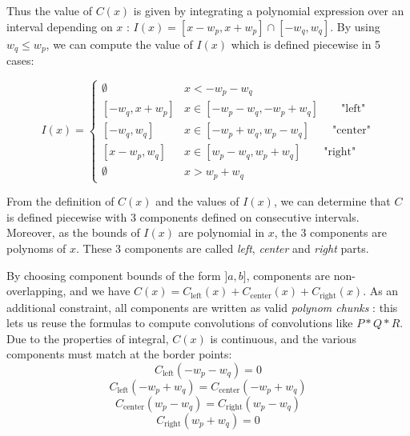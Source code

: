 \documentclass[a4paper,10pt]{article}
\newcommand\Convolution{\ast}
\begin{document}
Thus the value of $C(x)$ is given by integrating a polynomial expression over an interval depending on $x$ : $I(x) = [x-w_p,x+w_p] \cap [-w_q,w_q]$.
By using $w_q \le w_p$, we can compute the value of $I(x)$ which is defined piecewise in 5 cases:
\begin{center}\end{center}
\[ I(x) = \begin{cases}
    \emptyset & x < -w_p-w_q \\
    [-w_q, x+w_p] & x \in [-w_p-w_q, -w_p+w_q] \qquad \text{"left"} \\
    [-w_q, w_q] & x \in [-w_p+w_q, w_p-w_q] \qquad \text{"center"} \\
    [x-w_p, w_q] & x \in [w_p-w_q, w_p+w_q] \qquad \text{"right"} \\
    \emptyset & x > w_p + w_q
\end{cases} \]

From the definition of $C(x)$ and the values of $I(x)$, we can determine that $C$ is defined piecewise with 3 components defined on consecutive intervals.
Moreover, as the bounds of $I(x)$ are polynomial in $x$, the 3 components are polynoms of $x$.
These 3 components are called \emph{left}, \emph{center} and \emph{right} parts.

By choosing component bounds of the form $]a,b]$, components are non-overlapping, and we have $C(x) = C_\text{left}(x) + C_\text{center}(x) + C_\text{right}(x)$.
As an additional constraint, all components are written as valid \emph{polynom chunks} : this lets us reuse the formulas to compute convolutions of convolutions like $P \Convolution Q \Convolution R$.
Due to the properties of integral, $C(x)$ is continuous, and the various components must match at the border points:
\[ C_\text{left}(-w_p-w_q) = 0 \]
\[ C_\text{left}(-w_p+w_q) = C_\text{center}(-w_p+w_q) \]
\[ C_\text{center}(w_p-w_q) = C_\text{right}(w_p-w_q) \]
\[ C_\text{right}(w_p+w_q) = 0 \]
\end{document}
